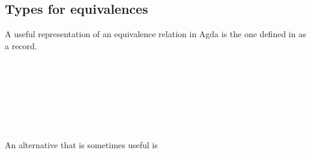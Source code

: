 \documentclass[a4paper,UKenglish,cleveref, autoref, thm-restate]{lipics-v2019}
\begin{document}
\subsection{Types for equivalences}\label{types-for-equivalences}
A useful representation of an equivalence relation in Agda is the one defined in \agdaualib as a record.
\begin{code}\>[0]\AgdaSpace{}%
\AgdaSpace{}%
\>[10]\AgdaSymbol{\{}\AgdaSpace{}%
\AgdaSymbol{:}\AgdaSpace{}%
\AgdaSymbol{\}}\<%
\\
\>[10]\AgdaSymbol{\{}\AgdaSpace{}%
\AgdaSymbol{:}\AgdaSpace{}%
\AgdaSpace{}%
\AgdaSpace{}%
\AgdaSymbol{\}}\<%
\\
\>[10]\AgdaSymbol{(}\AgdaSpace{}%
\AgdaSymbol{:}\AgdaSpace{}%
\AgdaSpace{}%
\AgdaSpace{}%
\AgdaSymbol{)}\AgdaSpace{}%
\AgdaSymbol{:}\AgdaSpace{}%
\AgdaSpace{}%
\AgdaSpace{}%
\AgdaSpace{}%
\AgdaSpace{}%
\<%
\\
\>[0][@{}l@{\AgdaIndent{0}}]%
\>[2]\<%
\\
\>[2][@{}l@{\AgdaIndent{0}}]%
\>[4]%
\>[9]\AgdaSymbol{:}\AgdaSpace{}%
\AgdaSpace{}%
\<%
\\
%
\>[4]%
\>[10]\AgdaSymbol{:}\AgdaSpace{}%
\AgdaSpace{}%
\<%
\\
%
\>[4]\AgdaSpace{}%
\AgdaSymbol{:}\AgdaSpace{}%
\AgdaSpace{}%
\<%
\end{code}
An alternative that is sometimes useful is
\end{document}
